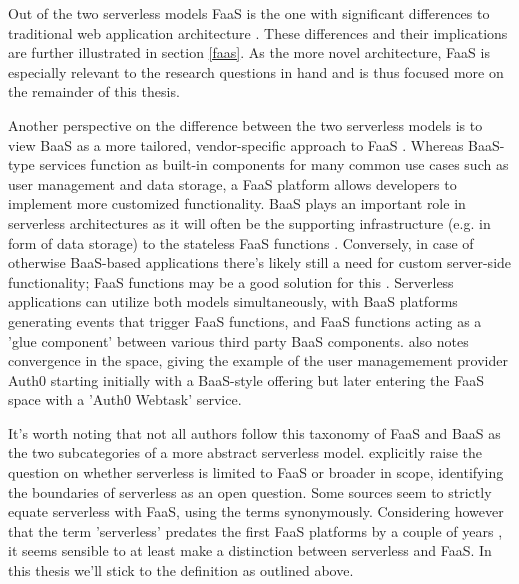 \documentclass[utf8,english]{gradu3}
\begin{document}
Out of the two serverless models FaaS is the one with significant differences to traditional web application architecture \parencite{robert2016serverlessarchitectures}. These differences and their implications are further illustrated in section \ref{faas}. As the more novel architecture, FaaS is especially relevant to the research questions in hand and is thus focused more on the remainder of this thesis.

Another perspective on the difference between the two serverless models is to view BaaS as a more tailored, vendor-specific approach to FaaS \parencite{van2017spec}. Whereas BaaS-type services function as built-in components for many common use cases such as user management and data storage, a FaaS platform allows developers to implement more customized functionality. BaaS plays an important role in serverless architectures as it will often be the supporting infrastructure (e.g. in form of data storage) to the stateless FaaS functions \parencite{cncf18serverlessWG}. Conversely, in case of otherwise BaaS-based applications there's likely still a need for custom server-side functionality; FaaS functions may be a good solution for this \parencite{robert2016serverlessarchitectures}. Serverless applications can utilize both models simultaneously, with BaaS platforms generating events that trigger FaaS functions, and FaaS functions acting as a 'glue component' between various third party BaaS components. \textcite{robert2016serverlessarchitectures} also notes convergence in the space, giving the example of the user managemement provider Auth0 starting initially with a BaaS-style offering but later entering the FaaS space with a 'Auth0 Webtask' service.

It's worth noting that not all authors follow this taxonomy of FaaS and BaaS as the two subcategories of a more abstract serverless model. \textcite{baldini17currentTrends} explicitly raise the question on whether serverless is limited to FaaS or broader in scope, identifying the boundaries of serverless as an open question. Some sources \parencite[][among others]{hendrickson16openlambda,mcgrath17implement,varghese18next} seem to strictly equate serverless with FaaS, using the terms synonymously. Considering however that the term 'serverless' predates the first FaaS platforms by a couple of years \parencite{robert2016serverlessarchitectures}, it seems sensible to at least make a distinction between serverless and FaaS. In this thesis we'll stick to the \textcite{cncf18serverlessWG} definition as outlined above.
\end{document}
